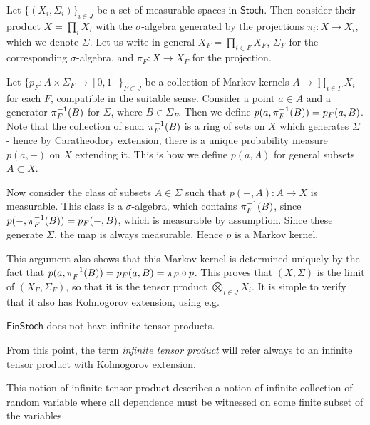 \documentclass[11pt]{article}
\renewcommand{\sf}{\mathsf}
\begin{document}
\begin{example}
Let $\{(X_i,\Sigma_i)\}_{i\in J}$ be a set of measurable spaces in $\sf{Stoch}$.
Then consider their product $X = \prod_i X_i$ with the $\sigma$-algebra generated by the projections $\pi_i: X \to X_i$, which we denote $\Sigma$.
Let us write in general $X_F = \prod_{i\in F}X_F$, $\Sigma_F$ for the corresponding $\sigma$-algebra, and $\pi_F: X \to X_F$ for the projection.

Let $\{p_F: A \times \Sigma_F \to [0,1]\}_{F \subset J}$ be a collection of Markov kernels $A \to \prod_{i \in F}X_i$ for each $F$, compatible in the suitable sense.
Consider a point $a \in A$ and a generator $\pi_F^{-1}(B)$ for $\Sigma$, where $B \in \Sigma_F$.
Then we define $p(a,\pi_F^{-1}(B)) = p_F(a,B)$.
Note that the collection of such $\pi_F^{-1}(B)$ is a ring of sets on $X$ which generates $\Sigma$ - hence by Caratheodory extension, there is a unique probability measure
$p(a,-)$ on $X$ extending it. This is how we define $p(a,A)$ for general subsets $A \subset X$.

Now consider the class of subsets $A \in \Sigma$ such that $p(-,A):A \to X$ is measurable.
This class is a $\sigma$-algebra, which contains $\pi_F^{-1}(B)$, since $p(-,\pi_F^{-1}(B)) = p_F(-,B)$, which is measurable by assumption.
Since these generate $\Sigma$, the map is always measurable.
Hence $p$ is a Markov kernel.

This argument also shows that this Markov kernel is determined uniquely by the fact that $p(a,\pi_F^{-1}(B)) = p_F(a,B) = \pi_F \circ p$.
This proves that $(X,\Sigma)$ is the limit of $(X_F,\Sigma_F)$, so that it is the tensor product $\bigotimes_{i\in J} X_i$.
It is simple to verify that it also has Kolmogorov extension, using e.g. \cite[Example~10.4]{markov_cats}
\end{example}

\begin{example}
	\label{infprods_finstoch}
	$\sf{FinStoch}$ does not have infinite tensor products.
\end{example}

From this point, the term \emph{infinite tensor product} will refer always to an infinite tensor product with Kolmogorov extension.

This notion of infinite tensor product describes a notion of infinite collection of random variable where all dependence must be witnessed on some finite subset of the variables.
\end{document}
